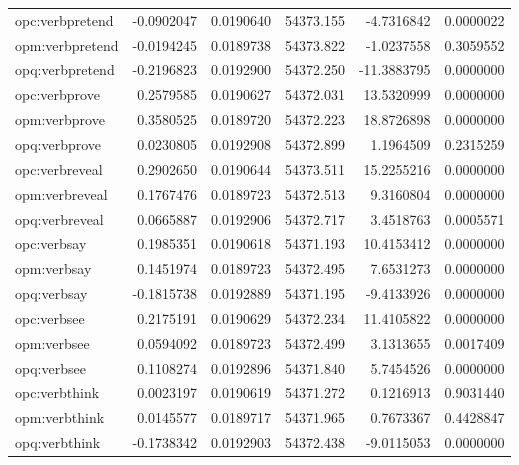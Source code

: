 \documentclass[12pt, a4paper]{article}
\begin{document}
\begin{table}[ht]
\begin{tabular}{lrrrrr}
		opc:verbpretend & -0.0902047 & 0.0190640 & 54373.155 & -4.7316842 & 0.0000022\\
		opm:verbpretend & -0.0194245 & 0.0189738 & 54373.822 & -1.0237558 & 0.3059552\\
		opq:verbpretend & -0.2196823 & 0.0192900 & 54372.250 & -11.3883795 & 0.0000000\\
		\addlinespace
		opc:verbprove & 0.2579585 & 0.0190627 & 54372.031 & 13.5320999 & 0.0000000\\
		opm:verbprove & 0.3580525 & 0.0189720 & 54372.223 & 18.8726898 & 0.0000000\\
		opq:verbprove & 0.0230805 & 0.0192908 & 54372.899 & 1.1964509 & 0.2315259\\
		opc:verbreveal & 0.2902650 & 0.0190644 & 54373.511 & 15.2255216 & 0.0000000\\
		opm:verbreveal & 0.1767476 & 0.0189723 & 54372.513 & 9.3160804 & 0.0000000\\
		\addlinespace
		opq:verbreveal & 0.0665887 & 0.0192906 & 54372.717 & 3.4518763 & 0.0005571\\
		opc:verbsay & 0.1985351 & 0.0190618 & 54371.193 & 10.4153412 & 0.0000000\\
		opm:verbsay & 0.1451974 & 0.0189723 & 54372.495 & 7.6531273 & 0.0000000\\
		opq:verbsay & -0.1815738 & 0.0192889 & 54371.195 & -9.4133926 & 0.0000000\\
		opc:verbsee & 0.2175191 & 0.0190629 & 54372.234 & 11.4105822 & 0.0000000\\
		\addlinespace
		opm:verbsee & 0.0594092 & 0.0189723 & 54372.499 & 3.1313655 & 0.0017409\\
		opq:verbsee & 0.1108274 & 0.0192896 & 54371.840 & 5.7454526 & 0.0000000\\
		opc:verbthink & 0.0023197 & 0.0190619 & 54371.272 & 0.1216913 & 0.9031440\\
		opm:verbthink & 0.0145577 & 0.0189717 & 54371.965 & 0.7673367 & 0.4428847\\
		opq:verbthink & -0.1738342 & 0.0192903 & 54372.438 & -9.0115053 & 0.0000000\\
		\bottomrule
	\end{tabular}
\end{table}

\newpage
\end{document}
